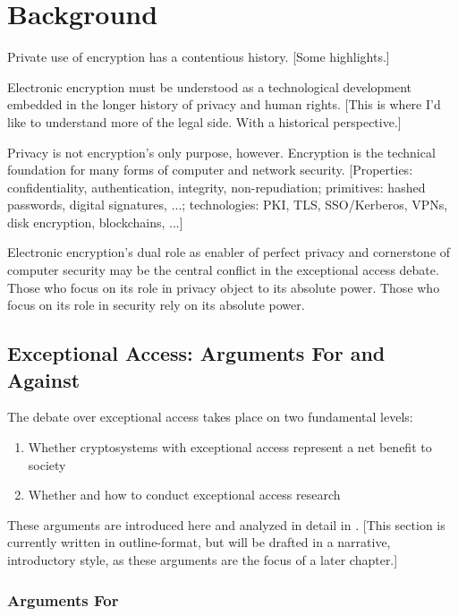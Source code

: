 \chapter{Background}
\label{chap-background}

Private use of encryption has a contentious history. [Some highlights.]

Electronic encryption must be understood as a technological development embedded in the longer history of privacy and
human rights. [This is where I'd like to understand more of the legal side. With a historical perspective.]

Privacy is not encryption's only purpose, however. Encryption is the technical foundation for many forms of computer and
network security. [Properties: confidentiality, authentication, integrity, non-repudiation; primitives: hashed
passwords, digital signatures, ...; technologies: PKI, TLS, SSO/Kerberos, VPNs, disk encryption, blockchains, ...]

Electronic encryption's dual role as enabler of perfect privacy and cornerstone of computer security may be the central
conflict in the exceptional access debate. Those who focus on its role in privacy object to its absolute power. Those
who focus on its role in security rely on its absolute power.


\section{Exceptional Access: Arguments For and Against}
\label{sec-argsbackground}

The debate over exceptional access takes place on two fundamental levels:
\begin{enumerate}
    \item Whether cryptosystems with exceptional access represent a net benefit to society
    \item Whether and how to conduct exceptional access research
\end{enumerate}

These arguments are introduced here and analyzed in detail in .
[This section is currently written in outline-format, but will be drafted in a narrative, introductory style, as these
arguments are the focus of a later chapter.]

\subsection{Arguments For}


